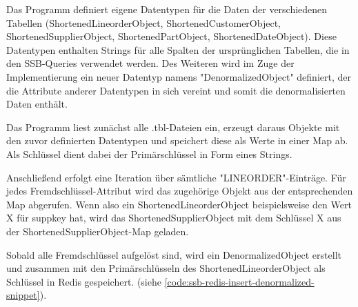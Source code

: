 Das Programm definiert eigene Datentypen für die Daten der verschiedenen Tabellen (ShortenedLineorderObject, ShortenedCustomerObject, ShortenedSupplierObject, ShortenedPartObject, ShortenedDateObject).
Diese Datentypen enthalten Strings für alle Spalten der ursprünglichen Tabellen, die in den \acs{SSB}-Queries verwendet werden.
Des Weiteren wird im Zuge der Implementierung ein neuer Datentyp namens "DenormalizedObject" definiert,
der die Attribute anderer Datentypen in sich vereint und somit die denormalisierten Daten enthält.

Das Programm liest zunächst alle .tbl-Dateien ein, erzeugt daraus Objekte mit den zuvor definierten Datentypen und speichert diese als Werte in einer Map ab. Als Schlüssel dient dabei der Primärschlüssel in Form eines Strings.

Anschließend erfolgt eine Iteration über sämtliche "LINEORDER"-Einträge.
Für jedes Fremdschlüssel-Attribut wird das zugehörige Objekt aus der entsprechenden Map abgerufen.
Wenn also ein ShortenedLineorderObject beispielsweise den Wert X für suppkey hat, wird das ShortenedSupplierObject mit dem Schlüssel X aus der ShortenedSupplierObject-Map geladen.

Sobald alle Fremdschlüssel aufgelöst sind, wird ein DenormalizedObject erstellt und zusammen mit den Primärschlüsseln des ShortenedLineorderObject als Schlüssel in Redis gespeichert. (siehe \cref{code:ssb-redis-insert-denormalized-snippet}).


